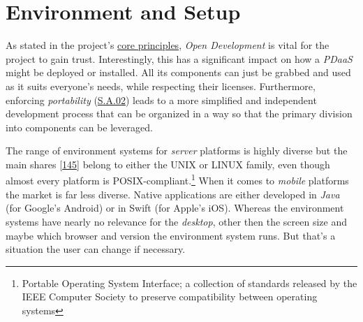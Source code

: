 \documentclass[12pt,english,a4paper,titlepage,cleardoublepage=empty,dottedtoc]{report}
\begin{document}
\section{Environment and Setup}\label{environment-and-setup}

As stated in the project's \protect\hyperlink{core-principles}{core
principles}, \emph{Open Development} is vital for the project to gain
trust. Interestingly, this has a significant impact on how a
\emph{PDaaS} might be deployed or installed. All its components can just
be grabbed and used as it suits everyone's needs, while respecting their
licenses. Furthermore, enforcing \emph{portability}
(\protect\hyperlink{sa02}{S.A.02}) leads to a more simplified and
independent development process that can be organized in a way so that
the primary division into components can be leveraged.

The range of environment systems for \emph{server} platforms is highly
diverse but the main shares
{[}\protect\hyperlink{ref-web_2017_wikipedia_os-market-share}{145}{]}
belong to either the UNIX or LINUX family, even though almost every
platform is POSIX-compliant.\footnote{Portable Operating System
  Interface; a collection of standards released by the IEEE Computer
  Society to preserve compatibility between operating systems} When it
comes to \emph{mobile} platforms the market is far less diverse. Native
applications are either developed in \emph{Java} (for Google's Android)
or in Swift (for Apple's iOS). Whereas the environment systems have
nearly no relevance for the \emph{desktop}, other then the screen size
and maybe which browser and version the environment system runs. But
that's a situation the user can change if necessary.
\end{document}
